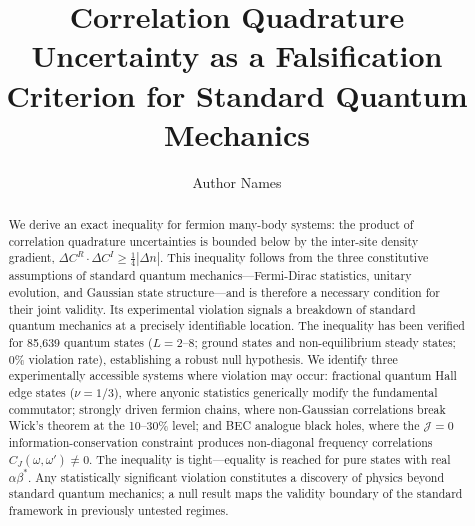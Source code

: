 \documentclass[aps,prd,reprint,superscriptaddress,twocolumn]{revtex4-2}
\begin{document}
\title{Correlation Quadrature Uncertainty as a Falsification Criterion for Standard Quantum Mechanics}

\author{Author Names}

\begin{abstract}
We derive an exact inequality for fermion many-body systems: the product of correlation quadrature uncertainties is bounded below by the inter-site density gradient, $\Delta C^R \cdot \Delta C^I \geq \frac{1}{4}|\Delta n|$. This inequality follows from the three constitutive assumptions of standard quantum mechanics---Fermi-Dirac statistics, unitary evolution, and Gaussian state structure---and is therefore a necessary condition for their joint validity. Its experimental violation signals a breakdown of standard quantum mechanics at a precisely identifiable location. The inequality has been verified for 85,639 quantum states ($L = 2$--$8$; ground states and non-equilibrium steady states; 0\% violation rate), establishing a robust null hypothesis. We identify three experimentally accessible systems where violation may occur: fractional quantum Hall edge states ($\nu = 1/3$), where anyonic statistics generically modify the fundamental commutator; strongly driven fermion chains, where non-Gaussian correlations break Wick's theorem at the 10--30\% level; and BEC analogue black holes, where the $\mathcal{J} = 0$ information-conservation constraint produces non-diagonal frequency correlations $C_J(\omega,\omega') \neq 0$. The inequality is tight---equality is reached for pure states with real $\alpha\beta^*$. Any statistically significant violation constitutes a discovery of physics beyond standard quantum mechanics; a null result maps the validity boundary of the standard framework in previously untested regimes.
\end{abstract}

\maketitle

\end{document}
